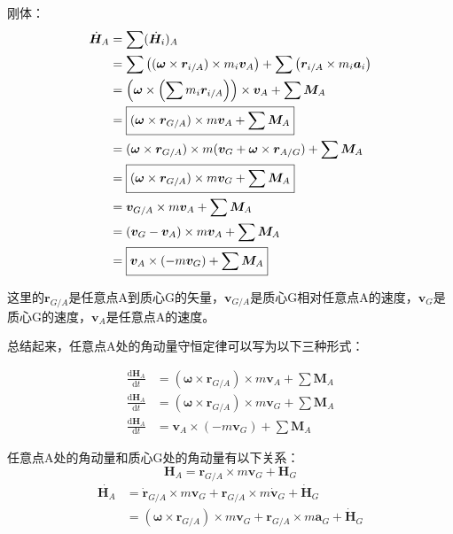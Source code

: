 刚体：
\begin{equation}
  \begin{split}
    \dot{\bm{H}}_A&=\sum(\dot{\bm{H}}_i)_A\\
    &=\sum\qty((\bm{\omega}\times\bm{r}_{i/A})\times m_i\bm{v}_A)+\sum\qty(\bm{r}_{i/A}\times m_i\bm{a}_i)\\
    &=\qty(\bm{\omega}\times\qty(\sum m_i\bm{r}_{i/A}))\times\bm{v}_A+\sum\bm{M}_A\\
    &=\boxed{(\bm{\omega}\times\bm{r}_{G/A})\times m\bm{v}_A+\sum\bm{M}_A}\\
    &=(\bm{\omega}\times\bm{r}_{G/A})\times m(\bm{v}_G+\bm{\omega}\times\bm{r}_{A/G})+\sum\bm{M}_A\\
    &=\boxed{(\bm{\omega}\times\bm{r}_{G/A})\times m\bm{v}_G+\sum\bm{M}_A}\\
    &=\bm{v}_{G/A}\times m\bm{v}_A+\sum\bm{M}_A\\
    &=(\bm{v}_G-\bm{v}_A)\times m\bm{v}_A+\sum\bm{M}_A\\
    &=\boxed{\bm{v}_A\times(-m\bm{v}_G)+\sum\bm{M}_A}
  \end{split}
\end{equation}
\begin{note}
  这里的$\bm{r}_{G/A}$是任意点A到质心G的矢量，$\bm{v}_{G/A}$是质心G相对任意点A的速度，$\bm{v}_G$是质心G的速度，$\bm{v}_A$是任意点A的速度。
\end{note}

总结起来，任意点A处的角动量守恒定律可以写为以下三种形式：
\begin{proposition}[任意点A角动量守恒定律]\label{prop:rigid momentum A}
  \begin{align}
    \frac{\mathrm{d}\bm{H}_A}{\mathrm{d}t}&=(\bm{\omega}\times\bm{r}_{G/A})\times m\bm{v}_A+\sum\bm{M}_A\\
    \frac{\mathrm{d}\bm{H}_A}{\mathrm{d}t}&=(\bm{\omega}\times\bm{r}_{G/A})\times m\bm{v}_G+\sum\bm{M}_A\\
    \frac{\mathrm{d}\bm{H}_A}{\mathrm{d}t}&=\boxed{\bm{v}_A\times(-m\bm{v}_G)}+\sum\bm{M}_A\label{eq:rigid momentum A}
  \end{align}
\end{proposition}

任意点A处的角动量和质心G处的角动量有以下关系：
\begin{equation}
  \bm{H}_A=\bm{r}_{G/A}\times m\bm{v}_G+\bm{H}_G
\end{equation}
\begin{equation}
  \begin{split}
    \dot{\bm{H}_A}&=\dot{\bm{r}}_{G/A}\times m\bm{v}_G+\bm{r}_{G/A}\times m\dot{\bm{v}}_G+\dot{\bm{H}}_G\\
    &=(\bm{\omega}\times\bm{r}_{G/A})\times m\bm{v}_G+\bm{r}_{G/A}\times m\bm{a}_G+\dot{\bm{H}}_G
  \end{split}
\end{equation}

